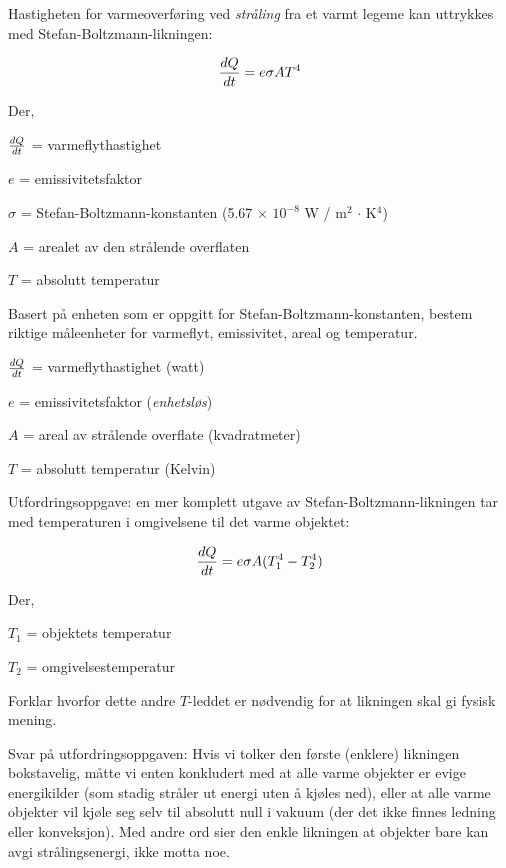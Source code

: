 
Hastigheten for varmeoverføring ved \textit{stråling} fra et varmt legeme kan uttrykkes med Stefan-Boltzmann-likningen:

$${dQ \over dt} = e \sigma A T^4$$

\noindent
Der,

$dQ \over dt$ = varmeflythastighet

$e$ = emissivitetsfaktor

$\sigma$ = Stefan-Boltzmann-konstanten (5.67 $\times$ $10^{-8}$ W / m$^{2}$ $\cdot$ K$^{4}$)

$A$ = arealet av den strålende overflaten

$T$ = absolutt temperatur

\vskip 10pt

Basert på enheten som er oppgitt for Stefan-Boltzmann-konstanten, bestem riktige måleenheter for varmeflyt, emissivitet, areal og temperatur.







$dQ \over dt$ = varmeflythastighet (watt)

$e$ = emissivitetsfaktor ({\it enhetsløs})

$A$ = areal av strålende overflate (kvadratmeter)

$T$ = absolutt temperatur (Kelvin)

\vskip 10pt

Utfordringsoppgave: en mer komplett utgave av Stefan-Boltzmann-likningen tar med temperaturen i omgivelsene til det varme objektet:

$${dQ \over dt} = e \sigma A (T_1^4 - T_2^4)$$

\noindent
Der,

$T_1$ = objektets temperatur

$T_2$ = omgivelsestemperatur

\vskip 10pt

Forklar hvorfor dette andre $T$-leddet er nødvendig for at likningen skal gi fysisk mening.







Svar på utfordringsoppgaven: Hvis vi tolker den første (enklere) likningen bokstavelig, måtte vi enten konkludert med at alle varme objekter er evige energikilder (som stadig stråler ut energi uten å kjøles ned), eller at alle varme objekter vil kjøle seg selv til absolutt null i vakuum (der det ikke finnes ledning eller konveksjon). Med andre ord sier den enkle likningen at objekter bare kan avgi strålingsenergi, ikke motta noe.



